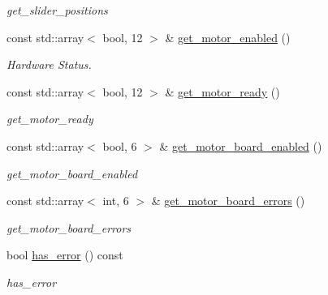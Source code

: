 \begin{DoxyCompactItemize}
\begin{DoxyCompactList}\small\item\em get\+\_\+slider\+\_\+positions \end{DoxyCompactList}\item 
const std\+::array$<$ bool, 12 $>$ \& \hyperlink{classblmc__robots_1_1Solo12_a079e0ab1f33cb8e6cae03a85f58e8c4f}{get\+\_\+motor\+\_\+enabled} ()
\begin{DoxyCompactList}\small\item\em Hardware Status. \end{DoxyCompactList}\item 
const std\+::array$<$ bool, 12 $>$ \& \hyperlink{classblmc__robots_1_1Solo12_a37584471402cef8cf854d69bdbac98eb}{get\+\_\+motor\+\_\+ready} ()
\begin{DoxyCompactList}\small\item\em get\+\_\+motor\+\_\+ready \end{DoxyCompactList}\item 
const std\+::array$<$ bool, 6 $>$ \& \hyperlink{classblmc__robots_1_1Solo12_af9265895ea76870eeeec913cb6794806}{get\+\_\+motor\+\_\+board\+\_\+enabled} ()
\begin{DoxyCompactList}\small\item\em get\+\_\+motor\+\_\+board\+\_\+enabled \end{DoxyCompactList}\item 
const std\+::array$<$ int, 6 $>$ \& \hyperlink{classblmc__robots_1_1Solo12_aac115dccae0a43c10ace81a348f86182}{get\+\_\+motor\+\_\+board\+\_\+errors} ()
\begin{DoxyCompactList}\small\item\em get\+\_\+motor\+\_\+board\+\_\+errors \end{DoxyCompactList}\item 
bool \hyperlink{classblmc__robots_1_1Solo12_af8d51ec7885dab9c017aec9dd11937ad}{has\+\_\+error} () const
\begin{DoxyCompactList}\small\item\em has\+\_\+error \end{DoxyCompactList}\end{DoxyCompactItemize}
